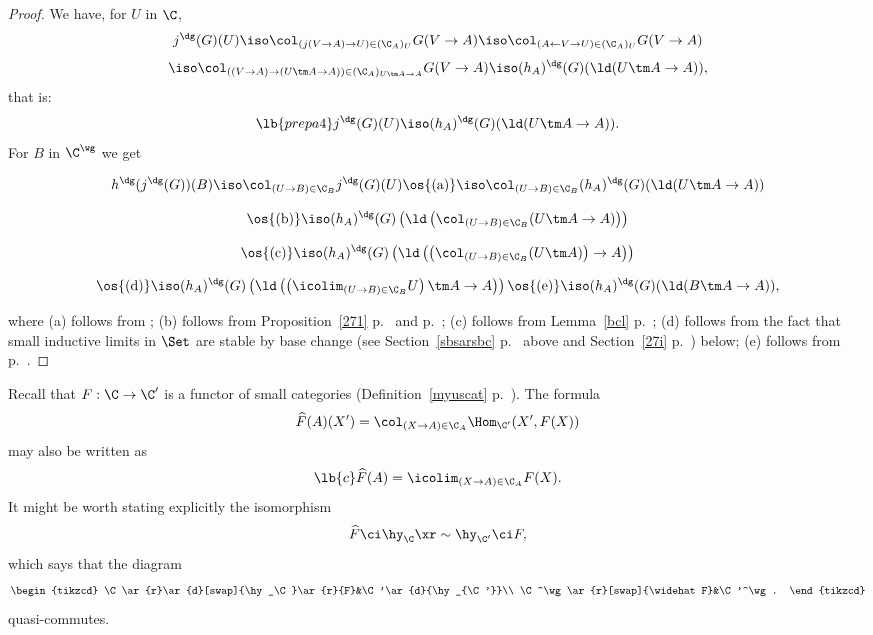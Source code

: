 \documentclass[12pt]{article}
\theoremstyle{remark}
\theoremstyle{definition}
\begin{document}
\begin{proof}
We have, for $U$ in $\C$, 
$$
j^\dg(G)(U)\iso\col_{(j(V\to A)\to U)\in(\C_A)_U}G(V\to A)\iso\col_{(A\leftarrow V\to U)\in(\C_A)_U}G(V\to A)
$$
$$
\iso\col_{((V\to A)\to(U\tm A\to A))\in(\C_A)_{U\tm A\to A}}G(V\to A)\iso(h_A)^\dg(G)(\ld(U\tm A\to A)),
$$
that is: 
\begin{equation}\lb{prepa4}
j^\dg(G)(U)\iso(h_A)^\dg(G)(\ld(U\tm A\to A)).
\end{equation} 
For $B$ in $\C^\wg$ we get 

$$h^\dg(j^\dg(G))(B)\iso\col_{(U\to B)\in\C_B}j^\dg(G)(U)\os{(\text a)}\iso\col_{(U\to B)\in\C_B}(h_A)^\dg(G)(\ld(U\tm A\to A))$$

$$\os{(\text b)}\iso(h_A)^\dg(G)\left(\ld\left(\col_{(U\to B)\in\C_B}(U\tm A\to A)\right)\right)$$

$$\os{(\text c)}\iso(h_A)^\dg(G)\left(\ld\left(\left(\col_{(U\to B)\in\C_B}(U\tm A)\right)\to A\right)\right)$$

$$\os{(\text d)}\iso(h_A)^\dg(G)\left(\ld\left(\left(\icolim_{(U\to B)\in\C_B}U\right)\tm A\to A\right)\right)\os{(\text e)}\iso(h_A)^\dg(G)(\ld(B\tm A\to A)),$$ 

\nn where 
(a) follows from ; 
(b) follows from Proposition~\ref{271} p.~ and  p.~;  
(c) follows from Lemma~\ref{bcl} p.~; 
(d) follows from the fact that small inductive limits in $\Set$ are stable by base change (see Section~\ref{sbsarsbc} p.~ above and Section~\ref{27i} p.~) below; 
(e) follows from  p.~.
\end{proof}



Recall that $F:\C\to\C'$ is a functor of small categories (Definition~\ref{myuscat} p.~). The formula 
$$
\widehat F(A)(X')=\col_{(X\to A)\in\C_A}\Hom_{\C'}(X',F(X))
$$ 
may also be written as 
\begin{equation}\lb{c}
\widehat F(A)=\icolim_{(X\to A)\in\C_A}F(X).
\end{equation}
It might be worth stating explicitly the isomorphism 
$$
\widehat F\ci\hy_\C\xr\sim\hy_{\C'}\ci F, 
$$ 
which says that the diagram 
$$
\begin{tikzcd}
\C\ar{r}\ar{d}[swap]{\hy_\C}\ar{r}{F}&\C'\ar{d}{\hy_{\C'}}\\ 
\C^\wg\ar{r}[swap]{\widehat F}&\C'^\wg.
\end{tikzcd}
$$ 
quasi-commutes. 
\end{document}
